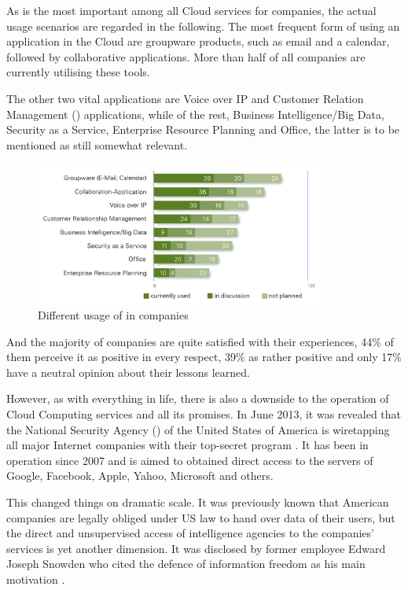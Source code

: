 As  is the most important among all Cloud services for companies, the actual usage scenarios are regarded in the following. The most frequent form of using an application in the Cloud are groupware products, such as email and a calendar, followed by collaborative applications. More than half of all companies are currently utilising these tools.

The other two vital applications are Voice over IP and Customer Relation Management () applications, while of the rest, Business Intelligence/Big Data, Security as a Service, Enterprise Resource Planning and Office, the latter is to be mentioned as still somewhat relevant.

\begin{figure}[H] %
	\centering
		\includegraphics[width=0.85\textwidth]{images/cloud_application_germany.png}
	\caption{Different usage of  in companies \cite{kpmg2014cloud}}
\end{figure}

And the majority of companies are quite satisfied with their experiences, 44\% of them perceive it as positive in every respect, 39\% as rather positive and only 17\% have a neutral opinion about their lessons learned.

However, as with everything in life, there is also a downside to the operation of Cloud Computing services and all its promises. In June 2013, it was revealed that the National Security Agency () of the United States of America is wiretapping all major Internet companies with their top-secret  program \cite{website:guardian-prism}. It has been in operation since 2007 and is aimed to obtained direct access to the servers of Google, Facebook, Apple, Yahoo, Microsoft and others. 

This changed things on dramatic scale. It was previously known that American companies are legally obliged under US law to hand over data of their users, but the direct and unsupervised access of intelligence agencies to the companies' services is yet another dimension. It was disclosed by former employee Edward Joseph Snowden who cited the defence of information freedom as his main motivation \cite{website:guardian-snowden}.

